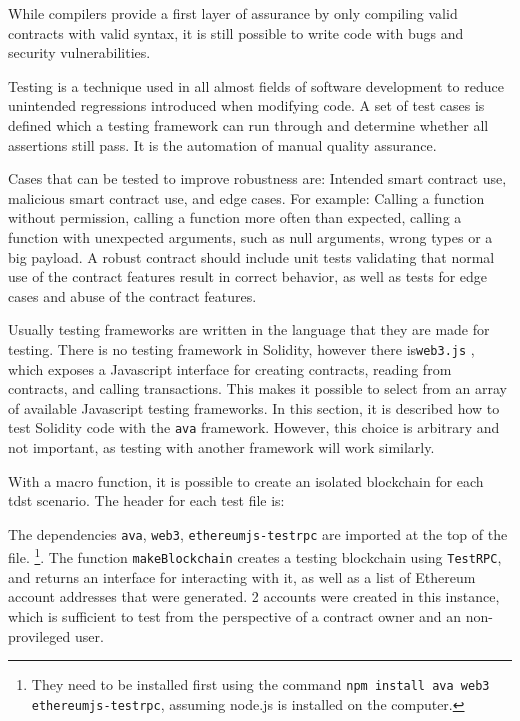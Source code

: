 While compilers provide a first layer of assurance by only compiling valid contracts with valid syntax, it is still possible to write code with bugs and security vulnerabilities.

Testing is a technique used in all almost fields of software development to reduce unintended regressions introduced when modifying code. A set of test cases is defined which a testing framework can run through and determine whether all assertions still pass. It is the automation of manual quality assurance.

Cases that can be tested to improve robustness are: Intended smart contract use, malicious smart contract use, and edge cases. For example: Calling a function without permission, calling a function more often than expected, calling a function with unexpected arguments, such as null arguments, wrong types or a big payload.
A robust contract should include unit tests validating that normal use of the contract features result in correct behavior, as well as tests for edge cases and abuse of the contract features.

Usually testing frameworks are written in the language that they are made for testing. There is no testing framework in  Solidity, however there is\texttt{web3.js} \cite{web3}, which exposes a Javascript interface for creating contracts, reading from contracts, and calling transactions. This makes it possible to select from an array of available Javascript testing frameworks. In this section, it is described how to test Solidity code with the \texttt{ava} framework. However, this choice is arbitrary and not important, as testing with another framework will work similarly.

With a macro function, it is possible to create an isolated blockchain for each tdst scenario. The header for each test file is:



The dependencies \texttt{ava}, \texttt{web3}, \texttt{ethereumjs-testrpc} are imported at the top of the file. \footnote{They need to be installed first using the command \texttt{npm install ava web3 ethereumjs-testrpc}, assuming node.js is installed on the computer.}. The function \texttt{makeBlockchain} creates a testing blockchain using \texttt{TestRPC}, and returns an interface for interacting with it, as well as a list of Ethereum account addresses that were generated. 2 accounts were created in this instance, which is sufficient to test from the perspective of a contract owner and an non-provileged user.

